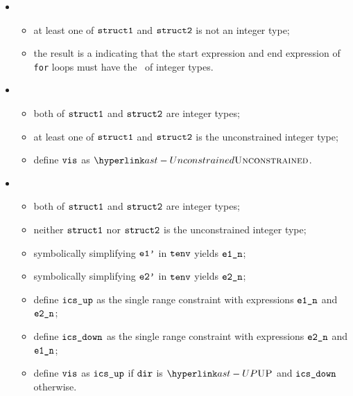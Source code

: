 \ProseParagraph
\OneApplies
\begin{itemize}
  \item {}
  \begin{itemize}
    \item at least one of $\structone$ and $\structtwo$ is not an integer type;
    \item the result is a \typingerrorterm{} indicating that the start expression and end expression of \texttt{for} loops
          must have the \structureterm\ of integer types.
  \end{itemize}

  \item {}
  \begin{itemize}
    \item both of $\structone$ and $\structtwo$ are integer types;
    \item at least one of $\structone$ and $\structtwo$ is the unconstrained integer type;
    \item define $\vis$ as $\Unconstrained$.
  \end{itemize}

  \item {}
  \begin{itemize}
    \item both of $\structone$ and $\structtwo$ are integer types;
    \item neither $\structone$ nor $\structtwo$ is the unconstrained integer type;
    \item symbolically simplifying $\veonep$ in $\tenv$ yields $\eonen$\ProseOrTypeError;
    \item symbolically simplifying $\vetwop$ in $\tenv$ yields $\etwon$\ProseOrTypeError;
    \item define $\icsup$ as the single range constraint with expressions $\eonen$ and $\etwon$;
    \item define $\icsdown$ as the single range constraint with expressions $\etwon$ and $\eonen$;
    \item define $\vis$ as $\icsup$ if $\dir$ is $\UP$ and $\icsdown$ otherwise.
  \end{itemize}
\end{itemize}

\FormallyParagraph
\begin{mathpar}
\end{mathpar}

